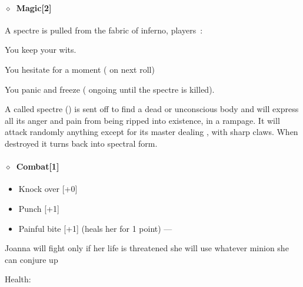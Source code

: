 \paragraph{\(\diamond\)~Magic[2]}%
\begin{description}[noitemsep]
  \item[Summon a Spectre] A spectre is pulled from the fabric of inferno, players~:
    \begin{description}[noitemsep]
      \item[(\KULTred{15+})] You keep your wits.
      \item[(\KULTred{10--14})] You hesitate for a moment ( on next roll)
      \item[(\KULTred{-9})] You panic and freeze ( ongoing until the spectre is killed).
    \end{description}
  \item[Manifest a Spectre] A called spectre () is sent off to find a dead or unconscious body and will
    express all its anger and pain from being ripped into existence, in a rampage.  It will attack randomly anything except for
    its master dealing , with sharp claws.  When destroyed it turns back into spectral form.
\end{description}
\paragraph{\(\diamond\)~Combat[1]}%
\begin{itemize}[noitemsep]
  \item Knock over [+0]
  \item Punch [+1]
  \item Painful bite [+1] (heals her for 1 point) --- 
\end{itemize}
Joanna will fight only if her life is threatened she will use whatever minion she can conjure up
\KULTrule%

Health:    
   


